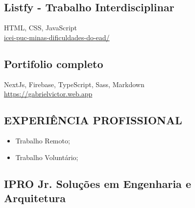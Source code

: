 \documentclass[a4paper]{article}
\begin{document}
\begin{multicols}{2}
\begin{framed}
      \small\subsection{Listfy - Trabalho Interdisciplinar}
      \footnotesize{HTML, CSS, JavaScript}\\
      \href{https://icei-puc-minas-pples-ti.github.io/plf-es-2021-1-ti1-7924100-dificuldades-do-ead/}{icei-puc-minas-dificuldades-do-ead/}

      \small\subsection{Portifolio completo}
      \footnotesize{NextJs, Firebase, TypeScript, Sass, Markdown}\\
      \href{https://gabrielvictor.web.app}{https://gabrielvictor.web.app}
  \end{framed}









  \begin{framed}
    \section{EXPERIÊNCIA PROFISSIONAL}
    \begin{itemize}
      \item Trabalho Remoto;
      \item Trabalho Voluntário;

    \end{itemize}

    \subsection{  IPRO Jr. Soluções em Engenharia e Arquitetura}


\end{framed}
\end{multicols}
\end{document}
